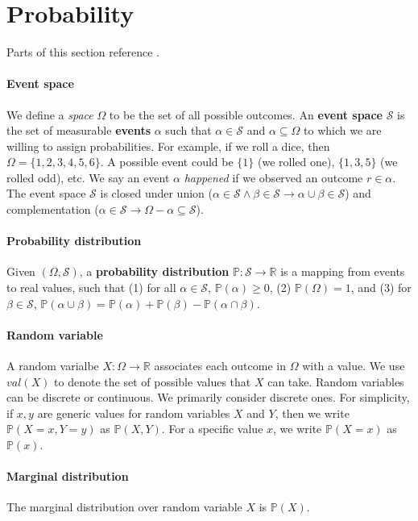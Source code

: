 \documentclass[12pt]{article}
\renewcommand{\P}{\mathbb{P}}
\theoremstyle{definition}
\begin{document}
\section{Probability}

Parts of this section reference \cite{koller2009probabilistic}.

\paragraph{Event space} We define a \emph{space} $\Omega$ to be the set of all possible outcomes. An \textbf{event space} $\mathcal{S}$ is the set of measurable \textbf{events} $\alpha$ such that $\alpha\in\mathcal{S}$ and $\alpha\subseteq\Omega$ to which we are willing to assign probabilities. For example, if we roll a dice, then $\Omega=\{1,2,3,4,5,6\}$. A possible event could be $\{1\}$ (we rolled one),  $\{1,3,5\}$ (we rolled odd), etc. We say an event $\alpha$ \emph{happened} if we observed an outcome $r\in\alpha$.  The event space $\mathcal{S}$ is closed under union ($\alpha\in\mathcal{S}\land \beta\in\mathcal{S}\rightarrow\alpha\cup\beta\in\mathcal{S}$) and complementation ($\alpha\in\mathcal{S}\rightarrow\Omega-\alpha\subseteq\mathcal{S}$).

\paragraph{Probability distribution} Given $(\Omega,\mathcal{S})$, a \textbf{probability distribution} $\P:\mathcal{S}\rightarrow\mathbb{R}$ is a mapping from events to real values, such that (1) for all $\alpha\in\mathcal{S}$, $\P(\alpha)\geq 0$, (2) $\P(\Omega)=1$, and (3) for $\beta\in\mathcal{S}$, $\P(\alpha\cup\beta)=\P(\alpha)+\P(\beta)-\P(\alpha\cap\beta)$.

\paragraph{Random variable} A random varialbe $X:\Omega\rightarrow\mathbb{R}$ associates each outcome in $\Omega$ with a value. We use $val(X)$ to denote the set of possible values that $X$ can take. Random variables can be discrete or continuous. We primarily consider discrete ones. For simplicity, if $x, y$ are generic values for random variables $X$ and $Y$, then we write $\P(X=x,Y=y)$ as $\P(X,Y)$. For a specific value $x$, we write $\P(X=x)$ as $\P(x)$.

\paragraph{Marginal distribution} The marginal distribution over random variable $X$ is $\P(X)$.
\end{document}

